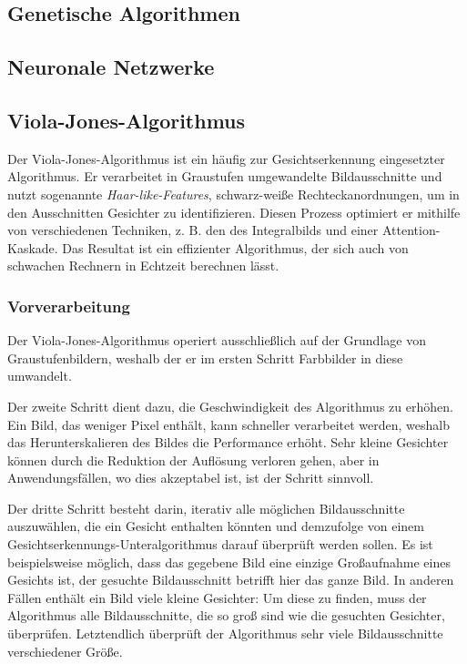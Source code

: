 \documentclass[doktyp=semarbeit, sprache=german]{TUBAFarbeiten}
\begin{document}
\subsection{Genetische Algorithmen}

\subsection{Neuronale Netzwerke}

\subsection{Viola-Jones-Algorithmus}
Der Viola-Jones-Algorithmus ist ein häufig zur Gesichtserkennung eingesetzter Algorithmus. Er verarbeitet in Graustufen umgewandelte Bildausschnitte und nutzt sogenannte \textit{Haar-like-Features}, schwarz-weiße Rechteckanordnungen, um in den Ausschnitten Gesichter zu identifizieren. Diesen Prozess optimiert er mithilfe von verschiedenen Techniken, z. B. den des Integralbilds und einer Attention-Kaskade. Das Resultat ist ein effizienter Algorithmus, der sich auch von schwachen Rechnern in Echtzeit berechnen lässt.

\subsubsection{Vorverarbeitung}
Der Viola-Jones-Algorithmus operiert ausschließlich auf der Grundlage von Graustufenbildern, weshalb der er im ersten Schritt Farbbilder in diese umwandelt.

Der zweite Schritt dient dazu, die Geschwindigkeit des Algorithmus zu erhöhen. Ein Bild, das weniger Pixel enthält, kann schneller verarbeitet werden, weshalb das Herunterskalieren des Bildes die Performance erhöht. Sehr kleine Gesichter können durch die Reduktion der Auflösung verloren gehen, aber in Anwendungsfällen, wo dies akzeptabel ist, ist der Schritt sinnvoll.

Der dritte Schritt besteht darin, iterativ alle möglichen Bildausschnitte auszuwählen, die ein Gesicht enthalten könnten und demzufolge von einem Gesichtserkennungs-Unteralgorithmus darauf überprüft werden sollen. Es ist beispielsweise möglich, dass das gegebene Bild eine einzige Großaufnahme eines Gesichts ist, der gesuchte Bildausschnitt betrifft hier das ganze Bild. In anderen Fällen enthält ein Bild viele kleine Gesichter: Um diese zu finden, muss der Algorithmus alle Bildausschnitte, die so groß sind wie die gesuchten Gesichter, überprüfen. Letztendlich überprüft der Algorithmus sehr viele Bildausschnitte verschiedener Größe.
\end{document}
